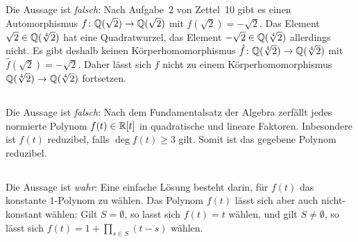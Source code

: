 \section{}





\subsection{}

Die Aussage ist \emph{falsch}:
Nach Aufgabe~2 von Zettel~10 gibt es einen Automorphismus $f \colon \mathbb{Q}(\sqrt{2}) \to \mathbb{Q}(\sqrt{2})$ mit $f(\sqrt{2}) = -\sqrt{2}$.
Das Element $\sqrt{2} \in \mathbb{Q}(\sqrt[4]{2})$ hat eine Quadratwurzel, das Element $-\sqrt{2} \in \mathbb{Q}(\sqrt[4]{2})$ allerdings nicht.
Es gibt deshalb keinen Körperhomomorphismus $\hat{f} \colon \mathbb{Q}(\sqrt[4]{2}) \to \mathbb{Q}(\sqrt[4]{2})$ mit $\hat{f}(\sqrt{2}) = -\sqrt{2}$.
Daher lässt sich $f$ nicht zu einem Körperhomomorphismus $\mathbb{Q}(\sqrt[4]{2}) \to \mathbb{Q}(\sqrt[4]{2})$ fortsetzen.





\subsection{}

Die Aussage ist \emph{falsch}:
Nach dem Fundamentalsatz der Algebra zerfällt jedes normierte Polynom $f(t) \in \mathbb{R}[t]$ in quadratische und lineare Faktoren.
Inbesondere ist $f(t)$ reduzibel, falls $\deg f(t) \geq 3$ gilt.
Somit ist das gegebene Polynom reduzibel.





\subsection{}

Die Aussage ist \emph{wahr}:
Eine einfache Lösung besteht darin, für $f(t)$ das konstante $1$-Polynom zu wählen.
Das Polynom $f(t)$ lässt sich aber auch nicht-konstant wählen:
Gilt $S = \emptyset$, so lasst sich $f(t) = t$ wählen, und gilt $S \neq \emptyset$, so lässt sich $f(t) = 1 + \prod_{s \in S} (t-s)$ wählen.





\subsection{}

